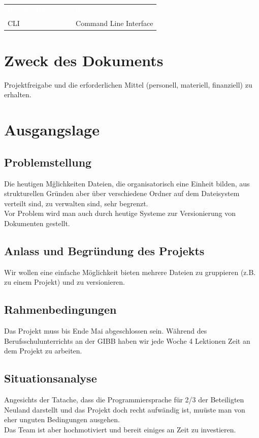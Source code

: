 \documentclass[10pt,paper=a4,final]{scrartcl}
\begin{document}
\begin{tabularx}{\textwidth}{l X}
\textcolor{white}{Begriff/ Abkürzung}\cellcolor{blue!80!} & \textcolor{white}{Bedeutung}\cellcolor{blue!80!} \\
CLI \cellcolor{blue!20!} & Command Line Interface\cellcolor{blue!20!} \\
\end{tabularx}
\newline
\newline
\newline

{}
\flushleft
\newpage
\tableofcontents
\newpage
\section{Zweck des Dokuments}
Projektfreigabe und die erforderlichen Mittel (personell, materiell, finanziell) zu erhalten.
\section{Ausgangslage}
\subsection{Problemstellung}
Die heutigen M\"glichkeiten Dateien, die organisatorisch eine Einheit bilden, aus strukturellen Gr\"unden aber \"uber verschiedene Ordner auf dem Dateisystem verteilt sind, zu verwalten sind, sehr begrenzt. \\
Vor Problem wird man auch durch heutige Systeme zur Versionierung von Dokumenten gestellt.
\subsection{Anlass und Begründung des Projekts}
Wir wollen eine einfache Möglichkeit bieten mehrere Dateien zu gruppieren (z.B. zu einem Projekt) und zu versionieren.
\subsection{Rahmenbedingungen}
Das Projekt muss bis Ende Mai abgeschlossen sein. W\"ahrend des Berufsschulunterrichts an der GIBB haben wir jede Woche 4 Lektionen Zeit an dem Projekt zu arbeiten.
\subsection{Situationsanalyse}
Angesichts der Tatache, dass die Programmiersprache f\"ur 2/3 der Beteiligten Neuland darstellt und das Projekt doch recht aufw\"andig ist, mu\"uste man von eher unguten Bedingungen ausgehen. \\
Das Team ist aber hochmotiviert und bereit einiges an Zeit zu investieren.
\end{document}
